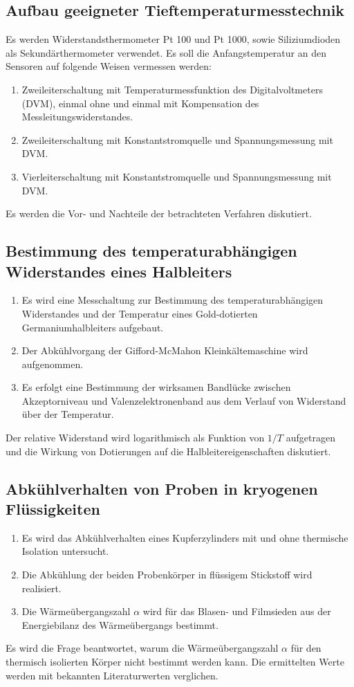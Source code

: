 \documentclass[parskip=half, a4paper,twoside,final]{article}
\begin{document}
\subsection{Aufbau geeigneter Tieftemperaturmesstechnik}

Es werden Widerstandsthermometer Pt 100 und Pt 1000, sowie Siliziumdioden als Sekundärthermometer verwendet. Es soll die Anfangstemperatur an den Sensoren auf folgende Weisen vermessen werden:
\begin{enumerate}
  \item Zweileiterschaltung mit Temperaturmessfunktion des Digitalvoltmeters (DVM), einmal ohne und einmal mit Kompensation des Messleitungswiderstandes.
  \item Zweileiterschaltung mit Konstantstromquelle und Spannungsmessung mit DVM.
  \item Vierleiterschaltung mit Konstantstromquelle und Spannungsmessung mit DVM.
\end{enumerate}

Es werden die Vor- und Nachteile der betrachteten Verfahren diskutiert.

\subsection{Bestimmung des temperaturabhängigen Widerstandes eines Halbleiters}

\begin{enumerate}
  \item Es wird eine Messchaltung zur Bestimmung des temperaturabhängigen Widerstandes und der Temperatur eines Gold-dotierten Germaniumhalbleiters aufgebaut.
  \item Der Abkühlvorgang der Gifford-McMahon Kleinkältemaschine wird aufgenommen.
  \item Es erfolgt eine Bestimmung der wirksamen Bandlücke zwischen Akzeptorniveau und Valenzelektronenband aus dem Verlauf von Widerstand über der Temperatur.
\end{enumerate}
Der relative Widerstand wird logarithmisch als Funktion von $1/T$ aufgetragen und die Wirkung von Dotierungen auf die Halbleitereigenschaften diskutiert.

\subsection{Abkühlverhalten von Proben in kryogenen Flüssigkeiten}
\begin{enumerate}
  \item Es wird das Abkühlverhalten eines Kupferzylinders mit und ohne thermische Isolation untersucht.
  \item Die Abkühlung der beiden Probenkörper in flüssigem Stickstoff wird realisiert.
  \item Die Wärmeübergangszahl $\alpha$ wird für das Blasen- und Filmsieden aus der Energiebilanz des Wärmeübergangs bestimmt.
\end{enumerate}
Es wird die Frage beantwortet, warum die Wärmeübergangszahl $\alpha$ für den thermisch isolierten Körper nicht bestimmt werden kann. Die ermittelten Werte werden mit bekannten Literaturwerten verglichen.
\end{document}
